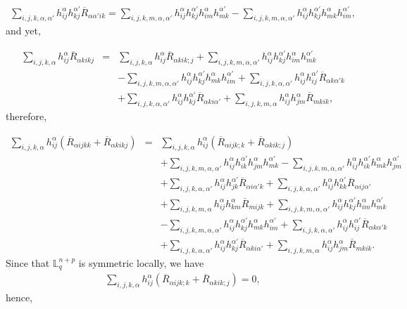 \documentclass[leqno,11pt]{amsart}
\theoremstyle{plain}
\theoremstyle{definition}
\numberwithin{equation}{section}
\begin{document}
\begin{eqnarray*}
\sum_{i,j,k,\alpha,\alpha'}h_{ij}^{\alpha}h_{kj}^{\alpha'}\overline{R}_{\alpha \alpha' ik}=\sum_{i,j,k,m,\alpha,\alpha'}h_{ij}^{\alpha}h_{kj}^{\alpha'}h_{im}^{\alpha}h_{mk}^{\alpha'}-\sum_{i,j,k,m,\alpha,\alpha'}h_{ij}^{\alpha}h_{kj}^{\alpha'}h_{mk}^{\alpha}h_{im}^{\alpha'},
\end{eqnarray*}
and yet, 

\begin{eqnarray*}
\sum_{i,j,k,\alpha}h_{ij}^{\alpha}\overline{R}_{\alpha kikj}&=&\sum_{i,j,k,\alpha}h_{ij}^{\alpha}\overline{R}_{\alpha kik;j}+\sum_{i,j,k,m,\alpha,\alpha'}h_{ij}^{\alpha}h_{kj}^{\alpha'}h_{im}^{\alpha}h_{mk}^{\alpha'}\\&&-\sum_{i,j,k,m,\alpha,\alpha'}h_{ij}^{\alpha}h_{kj}^{\alpha'}h_{mk}^{\alpha}h_{im}^{\alpha'}+\sum_{i,j,k,\alpha,\alpha'}h_{ij}^{\alpha}h_{ij}^{\alpha'}\overline{R}_{\alpha k \alpha'k}\\&&+\sum_{i,j,k,\alpha,\alpha'}h_{ij}^{\alpha}h_{kj}^{\alpha'}\overline{R}_{\alpha ki \alpha'}+\sum_{i,j,k,m,\alpha}h_{ij}^{\alpha}h_{jm}^{\alpha}\overline{R}_{mkik},
\end{eqnarray*}
therefore,


\begin{eqnarray*}
\sum_{i,j,k,\alpha}h_{ij}^{\alpha}
  (\overline{R}_{\alpha ijkk}+\overline{R}_{\alpha kikj})
&=& \sum_{i,j,k,\alpha}h_{ij}^{\alpha}
       (\overline{R}_{\alpha ijk;k}+\overline{R}_{\alpha kik;j}) \\[0.3em]
&&+ \sum_{i,j,k,m,\alpha,\alpha'}h_{ij}^{\alpha}h_{ik}^{\alpha'}h_{jm}^{\alpha}h_{mk}^{\alpha'}
   - \sum_{i,j,k,m,\alpha,\alpha'}h_{ij}^{\alpha}h_{ik}^{\alpha'}h_{mk}^{\alpha}h_{jm}^{\alpha'} \\[0.3em]
&&+ \sum_{i,j,k,\alpha,\alpha'}h_{ij}^{\alpha}h_{jk}^{\alpha'}\overline{R}_{\alpha i\alpha' k}
   + \sum_{i,j,k,\alpha,\alpha'}h_{ij}^{\alpha}h_{kk}^{\alpha'}\overline{R}_{\alpha ij \alpha'} \\[0.3em]
&&+ \sum_{i,j,k,m,\alpha}h_{ij}^{\alpha}h_{km}^{\alpha}\overline{R}_{mijk}
   + \sum_{i,j,k,m,\alpha,\alpha'}h_{ij}^{\alpha}h_{kj}^{\alpha'}h_{im}^{\alpha}h_{mk}^{\alpha'} \\[0.3em]
&&- \sum_{i,j,k,m,\alpha,\alpha'}h_{ij}^{\alpha}h_{kj}^{\alpha'}h_{mk}^{\alpha}h_{im}^{\alpha'}
   + \sum_{i,j,k,\alpha,\alpha'}h_{ij}^{\alpha}h_{ij}^{\alpha'}\overline{R}_{\alpha k\alpha' k} \\[0.3em]
&&+ \sum_{i,j,k,\alpha,\alpha'}h_{ij}^{\alpha}h_{kj}^{\alpha'}\overline{R}_{\alpha ki \alpha'}
   + \sum_{i,j,k,m,\alpha}h_{ij}^{\alpha}h_{jm}^{\alpha}\overline{R}_{mkik}.
\end{eqnarray*}
Since that $\mathbb{L}_{q}^{n+p}$ is {symmetric locally}, we have
\begin{eqnarray*}
\sum_{i,j,k,\alpha}h_{ij}^{\alpha}(\overline{R}_{\alpha ijk;k}+\overline{R}_{\alpha kik;j})=0,
\end{eqnarray*}
hence,
\end{document}
